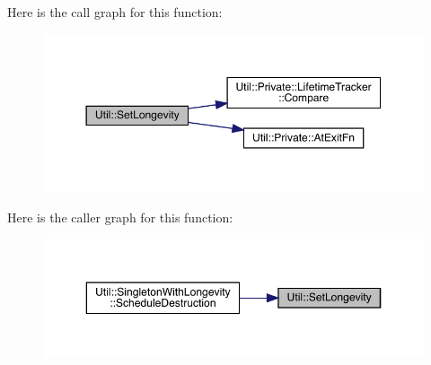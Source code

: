 Here is the call graph for this function\+:\nopagebreak
\begin{figure}[H]
\begin{center}
\leavevmode
\includegraphics[width=350pt]{d2/daf/namespaceUtil_a3883209db7bb694594e3cbde04febb5d_cgraph}
\end{center}
\end{figure}
Here is the caller graph for this function\+:\nopagebreak
\begin{figure}[H]
\begin{center}
\leavevmode
\includegraphics[width=350pt]{d2/daf/namespaceUtil_a3883209db7bb694594e3cbde04febb5d_icgraph}
\end{center}
\end{figure}
